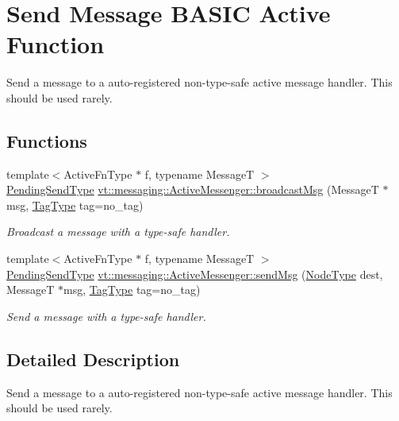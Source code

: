 \hypertarget{group__basicsend}{}\section{Send Message B\+A\+S\+IC Active Function}
\label{group__basicsend}


Send a message to a auto-\/registered non-\/type-\/safe active message handler. This should be used rarely.  


\subsection*{Functions}
\begin{DoxyCompactItemize}
\item 
{\footnotesize template$<$Active\+Fn\+Type $\ast$ f, typename MessageT $>$ }\\\hyperlink{structvt_1_1messaging_1_1_active_messenger_a3626a6ca76d8ad4ec7c3b47a2c70d3a8}{Pending\+Send\+Type} \hyperlink{group__basicsend_gaadd12687ecb3f0e9be2ce62224568d77}{vt\+::messaging\+::\+Active\+Messenger\+::broadcast\+Msg} (MessageT $\ast$msg, \hyperlink{namespacevt_a84ab281dae04a52a4b243d6bf62d0e52}{Tag\+Type} tag=no\+\_\+tag)
\begin{DoxyCompactList}\small\item\em Broadcast a message with a type-\/safe handler. \end{DoxyCompactList}\item 
{\footnotesize template$<$Active\+Fn\+Type $\ast$ f, typename MessageT $>$ }\\\hyperlink{structvt_1_1messaging_1_1_active_messenger_a3626a6ca76d8ad4ec7c3b47a2c70d3a8}{Pending\+Send\+Type} \hyperlink{group__basicsend_ga9a7d3d70ca04c51781771661fa5d3795}{vt\+::messaging\+::\+Active\+Messenger\+::send\+Msg} (\hyperlink{namespacevt_a866da9d0efc19c0a1ce79e9e492f47e2}{Node\+Type} dest, MessageT $\ast$msg, \hyperlink{namespacevt_a84ab281dae04a52a4b243d6bf62d0e52}{Tag\+Type} tag=no\+\_\+tag)
\begin{DoxyCompactList}\small\item\em Send a message with a type-\/safe handler. \end{DoxyCompactList}\end{DoxyCompactItemize}


\subsection{Detailed Description}
Send a message to a auto-\/registered non-\/type-\/safe active message handler. This should be used rarely. 

